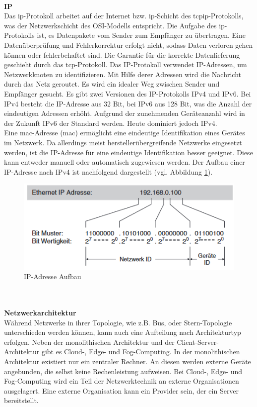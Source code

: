 \documentclass[ a4paper,
                oneside,
                toc=bibliography,
                toc=listof
                ]{scrbook}
\begin{document}
	\\
	\textbf{IP} \\
	Das \ac{ip}-Protokoll arbeitet auf der Internet bzw. \ac{ip}-Schicht des \ac{tcpip}-Protokolls, was der Netzwerkschicht des OSI-Modells entspricht. Die Aufgabe des \acs{ip}-Protokolls ist, es Datenpakete vom Sender zum Empfänger zu übertragen. Eine Datenüberprüfung und Fehlerkorrektur erfolgt nicht, sodass Daten verloren gehen können oder fehlerbehaftet sind. Die Garantie für die korrekte Datenlieferung geschieht durch das \acs{tcp}-Protokoll. Das IP-Protokoll verwendet IP-Adressen, um Netzwerkknoten zu identifizieren. Mit Hilfe derer Adressen wird die Nachricht durch das Netz \glqq geroutet\grqq. Es wird ein idealer Weg zwischen Sender und Empfänger gesucht. \cite{harnisch2009netzwerktechnik} \cite{riggert2002rechnernetze} Es gibt zwei Versionen des IP-Protokolls IPv4 und IPv6. Bei IPv4 besteht die IP-Adresse aus 32 Bit, bei IPv6 aus 128 Bit, was die Anzahl der eindeutigen Adressen erhöht. Aufgrund der zunehmenden Geräteanzahl wird in der Zukunft IPv6 der Standard werden. Heute dominiert jedoch IPv4. \cite{riggert2002rechnernetze} \\
	Eine \acs{mac}-Adresse (\acl{mac}) ermöglicht eine eindeutige Identifikation eines Gerätes im Netzwerk. Da allerdings meist herstellerübergreifende Netzwerke eingesetzt werden, ist die IP-Adresse für eine eindeutige Identifikation besser geeignet. Diese kann entweder manuell oder automatisch zugewiesen werden. Der Aufbau einer IP-Adresse nach IPv4 ist nachfolgend dargestellt (vgl. Abbildung \ref{fig:IP-Adresse}).  \cite{hering2012elektrotechnik}
   	\begin{figure}[!ht]
   		\centering
   		\includegraphics[width=0.70\linewidth]{./images/IP Adresse Aufbau.png}
   		\caption{IP-Adresse Aufbau \cite{hering2012elektrotechnik}} 
   		\label{fig:IP-Adresse}
   	\end{figure}
   	\\
   	\\
   	\textbf{Netzwerkarchitektur}\\
   	Während Netzwerke in ihrer Topologie, wie z.B. Bus, oder Stern-Topologie unterschieden werden können, kann auch eine Aufteilung nach Architekturtyp erfolgen. Neben der monolithischen Architektur und der Client-Server-Architektur gibt es Cloud-, Edge- und Fog-Computing. In der monolithischen Architektur existiert nur ein zentraler Rechner. An diesen werden externe Geräte angebunden, die selbst keine Rechenleistung aufweisen. Bei Cloud-, Edge- und Fog-Computing wird ein Teil der Netzwerktechnik an externe Organisationen ausgelagert. Eine externe Organisation kann ein Provider sein, der ein Server bereitstellt. \\
\end{document}
